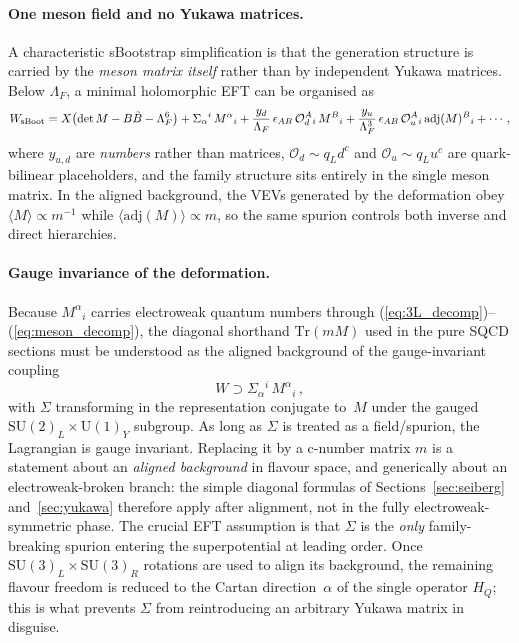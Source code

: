 \documentclass[11pt,a4paper]{article}
\newcommand{\SU}{\mathrm{SU}}
\newcommand{\UU}{\mathrm{U}}
\newcommand{\Tr}{\mathrm{Tr}}
\newcommand{\adj}{\mathrm{adj}}
\begin{document}
\paragraph{One meson field and no Yukawa matrices.}
A characteristic sBootstrap simplification is that the generation structure is
carried by the \emph{meson matrix itself} rather than by independent Yukawa
matrices.  Below $\Lambda_F$, a minimal holomorphic EFT can be organised as
\begin{equation}
  W_{\rm sBoot}
  = X\bigl(\det M - B\tilde B - \Lambda_F^6\bigr)
  + \Sigma_\alpha{}^i\,M^\alpha{}_i
  + \frac{y_d}{\Lambda_F}\,\epsilon_{AB}\,\mathcal{O}_d^{A}{}_{i}\,M^{B}{}_{i}
  + \frac{y_u}{\Lambda_F^3}\,\epsilon_{AB}\,\mathcal{O}_u^{A}{}_{i}\,\adj(M)^{B}{}_{i}
  + \cdots\,,
  \label{eq:Wsboot}
\end{equation}
where $y_{u,d}$ are \emph{numbers} rather than matrices,
$\mathcal{O}_d\sim q_L d^c$ and $\mathcal{O}_u\sim q_L u^c$ are
quark-bilinear placeholders, and the family structure sits entirely in the
single meson matrix.  In the aligned background, the VEVs generated by the
deformation obey $\langle M\rangle\propto m^{-1}$ while
$\langle\adj(M)\rangle\propto m$, so the same spurion controls both inverse and
direct hierarchies.

\paragraph{Gauge invariance of the deformation.}
Because $M^\alpha{}_i$ carries electroweak quantum numbers through
(\ref{eq:3L_decomp})--(\ref{eq:meson_decomp}), the diagonal shorthand
$\Tr(mM)$ used in the pure SQCD sections must be understood as the aligned
background of the gauge-invariant coupling
\begin{equation}
  W \supset \Sigma_\alpha{}^i\,M^\alpha{}_i\,,
  \label{eq:spurionSigma}
\end{equation}
with $\Sigma$ transforming in the representation conjugate to~$M$ under the
gauged $\SU(2)_L\times\UU(1)_Y$ subgroup.  As long as $\Sigma$ is treated as a
field/spurion, the Lagrangian is gauge invariant.  Replacing it by a c-number
matrix $m$ is a statement about an \emph{aligned background} in flavour space,
and generically about an electroweak-broken branch: the simple diagonal formulas
of Sections~\ref{sec:seiberg} and~\ref{sec:yukawa} therefore apply after
alignment, not in the fully electroweak-symmetric phase.
The crucial EFT assumption is that $\Sigma$ is the \emph{only} family-breaking
spurion entering the superpotential at leading order.  Once
$\SU(3)_L\times\SU(3)_R$ rotations are used to align its background, the
remaining flavour freedom is reduced to the Cartan direction~$\alpha$ of the
single operator $H_Q$; this is what prevents $\Sigma$ from reintroducing an
arbitrary Yukawa matrix in disguise.
\end{document}
